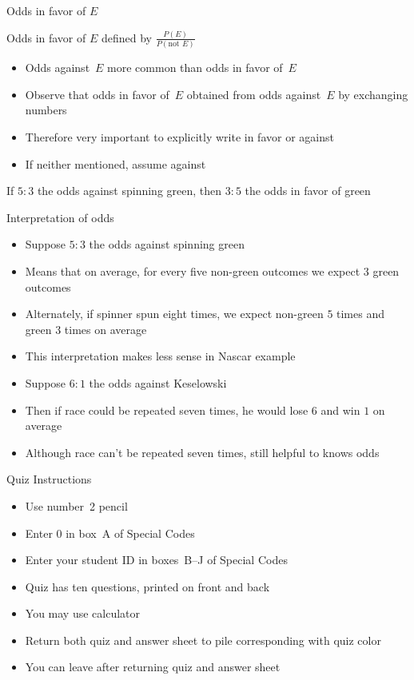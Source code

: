 \documentclass[handout]{beamer}
\theoremstyle{definition}
\begin{document}
\begin{frame}{Odds in favor of $E$}
\begin{definition}
\alert{Odds in favor of $E$} defined by
$\frac{P\left(E\right)}{P\left(\text{not $E$}\right)}$
\end{definition}
\begin{itemize}
\item Odds against~$E$ more common than odds in favor of~$E$
\item Observe that odds in favor of~$E$ obtained
from odds against~$E$ by exchanging numbers
\item Therefore very important to explicitly write
\alert{in favor} or \alert{against}
\item If neither mentioned, assume \alert{against}
\end{itemize}
\begin{example} If $5:3$ the odds against spinning green,
then $3:5$ the odds in favor of green
\end{example}
\end{frame}

\begin{frame}{Interpretation of odds} 
\begin{itemize}
\item Suppose $5:3$ the odds against spinning green
\item Means that on average, for every five non-green outcomes
we expect $3$ green outcomes
\item Alternately, if spinner spun eight times, we expect
non-green $5$ times and green $3$ times on average
\item This interpretation makes less sense in Nascar example
\item Suppose $6:1$ the odds against Keselowski
\item Then if race could be repeated seven times, he would
lose $6$ and win $1$ on average
\item Although race can't be repeated seven times,
still helpful to knows odds
\end{itemize}
\end{frame}

\begin{frame}{Quiz Instructions}
\begin{itemize}
\item Use number~2 pencil
\item Enter $0$ in box~A of Special Codes
\item Enter your student ID in boxes~B--J of Special Codes
\item Quiz has ten questions, printed on front and back
\item You \alert{may} use calculator
\item Return both quiz and answer sheet to pile
corresponding with quiz color
\item You can leave after returning quiz and answer sheet
\end{itemize}
\end{frame}
\end{document}
